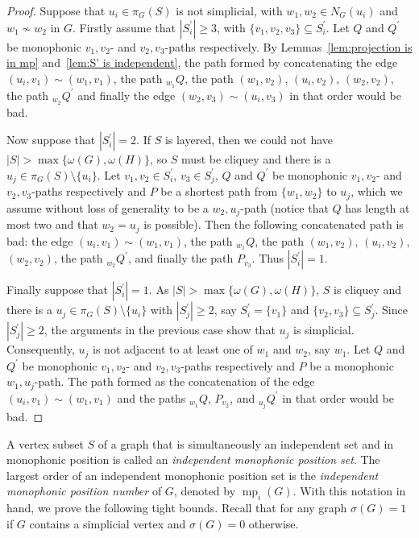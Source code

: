 \documentclass[12pt]{article}
\DeclareMathOperator {\mono} {mp}
\begin{document}
\begin{proof}
Suppose that $u_i\in \pi _G(S)$ is not simplicial, with $w_1,w_2 \in N_G(u_i)$ and $w_1 \not \sim w_2$ in $G$. Firstly assume that $|S_i^{\prime }| \geq 3$, with $\{ v_1,v_2,v_3\} \subseteq S_i^{\prime }$. Let $Q$ and $Q^{\prime }$ be monophonic $v_1,v_2$- and $v_2,v_3$-paths respectively. By Lemmas~\ref{lem:projection is in mp} and~\ref{lem:S' is independent}, the path formed by concatenating the edge $(u_i,v_1) \sim (w_1,v_1)$, the path $_{w_1}Q$, the path $(w_1,v_2)$, $(u_i,v_2)$, $(w_2,v_2)$, the path $_{w_2}Q^{\prime }$ and finally the edge $(w_2,v_3) \sim (u_i,v_3)$ in that order would be bad.

Now suppose that $|S_i^{\prime }| = 2$. If $S$ is layered, then we could not have $|S| > \max \{ \omega (G),\omega (H)\} $, so $S$ must be cliquey and there is a $u_j \in \pi _G(S) \setminus \{ u_i\} $. Let $v_1,v_2 \in S_i^{\prime }$, $v_3 \in S_j^{\prime }$, $Q$ and $Q^{\prime }$ be monophonic $v_1,v_2$- and $v_2,v_3$-paths respectively and $P$ be a shortest path from $\{ w_1,w_2\} $ to $u_j$, which we assume without loss of generality to be a $w_2,u_j$-path (notice that $Q$ has length at most two and that $w_2 = u_j$ is possible). Then the following concatenated path is bad: the edge $(u_i,v_1) \sim (w_1,v_1)$, the path $_{w_1}Q$, the path $(w_1,v_2)$, $(u_i,v_2)$, $(w_2,v_2)$, the path $_{w_2}Q^{\prime}$, and finally the path $P_{v_3}$. Thus $|S_i^{\prime }| = 1$.

Finally suppose that $|S_i^{\prime }| = 1$. As $|S| > \max \{ \omega (G),\omega (H)\} $, $S$ is cliquey and there is a $u_j \in \pi _G(S) \setminus \{ u_i\} $ with $|S_j^{\prime }| \geq 2$, say $S_i^{\prime } = \{ v_1\} $ and $\{ v_2,v_3\} \subseteq S_j^{\prime }$. Since $|S_j^{\prime }| \geq 2$, the arguments in the previous case show that $u_j$ is simplicial. Consequently, $u_j$ is not adjacent to at least one of $w_1$ and $w_2$, say $w_1$. Let $Q$ and $Q^{\prime }$ be monophonic $v_1,v_2$- and $v_2,v_3$-paths respectively and $P$ be a monophonic $w_1,u_j$-path. The path formed as the concatenation of the edge $(u_i,v_1) \sim (w_1,v_1)$ and the paths $_{w_1}Q$, $P_{v_2}$, and $_{u_j}Q^{\prime }$ in that order would be bad.  
\end{proof}

A vertex subset $S$ of a graph that is simultaneously an independent set and in monophonic position is called an \emph{independent monophonic position set}. The largest order of an independent monophonic position set is the \emph{independent monophonic position number} of $G$, denoted by $\mono_i(G)$. With this notation in hand, we prove the following tight bounds. Recall that for any graph $\sigma (G) = 1$ if $G$ contains a simplicial vertex and $\sigma (G) = 0$ otherwise.
    
\end{document}
